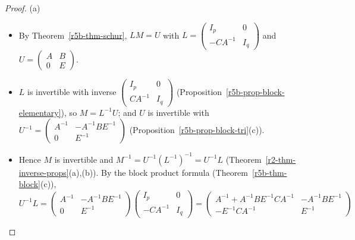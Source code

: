 \documentclass[12pt]{article}
\theoremstyle{definition}
\begin{document}
\begin{proof}
(a)
\begin{itemize}
\item By Theorem~\ref{r5b-thm-schur}, \(LM=U\) with
\(L=\left(\begin{smallmatrix}I_p&0\\-CA^{-1}&I_q\end{smallmatrix}\right)\) and
\(U=\left(\begin{smallmatrix}A&B\\0&E\end{smallmatrix}\right)\).
\item \(L\) is invertible with inverse \(\left(\begin{smallmatrix}I_p&0\\CA^{-1}&I_q\end{smallmatrix}\right)\)
(Proposition~\ref{r5b-prop-block-elementary}), so \(M=L^{-1}U\); and \(U\) is invertible with
\(U^{-1}=\left(\begin{smallmatrix}A^{-1}&-A^{-1}BE^{-1}\\0&E^{-1}\end{smallmatrix}\right)\)
(Proposition~\ref{r5b-prop-block-tri}(c)).
\item Hence \(M\) is invertible and \(M^{-1}=U^{-1}(L^{-1})^{-1}=U^{-1}L\)
(Theorem~\ref{r2-thm-inverse-props}(a),(b)). By the block product formula
(Theorem~\ref{r5b-thm-block}(c)),
\[
U^{-1}L=\begin{pmatrix}A^{-1}&-A^{-1}BE^{-1}\\0&E^{-1}\end{pmatrix}
\begin{pmatrix}I_p&0\\-CA^{-1}&I_q\end{pmatrix}
=\begin{pmatrix}A^{-1}+A^{-1}BE^{-1}CA^{-1}&-A^{-1}BE^{-1}\\-E^{-1}CA^{-1}&E^{-1}\end{pmatrix}
\]
\end{itemize}


\end{proof}
\end{document}
